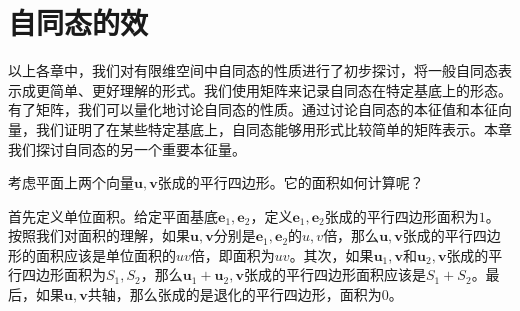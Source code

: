 \documentclass[12pt,UTF8]{ctexbook}
\begin{document}
\chapter{自同态的效}
以上各章中，我们对有限维空间中自同态的性质进行了初步探讨，将一般自同态表示成更简单、更好理解的形式。我们使用矩阵来记录自同态在特定基底上的形态。有了矩阵，我们可以量化地讨论自同态的性质。通过讨论自同态的本征值和本征向量，我们证明了在某些特定基底上，自同态能够用形式比较简单的矩阵表示。本章我们探讨自同态的另一个重要本征量。

考虑平面上两个向量$\mathbf{u}, \mathbf{v}$张成的平行四边形。它的面积如何计算呢？

首先定义单位面积。给定平面基底$\mathbf{e}_1, \mathbf{e}_2$，定义$\mathbf{e}_1, \mathbf{e}_2$张成的平行四边形面积为$1$。按照我们对面积的理解，如果$\mathbf{u}, \mathbf{v}$分别是$\mathbf{e}_1, \mathbf{e}_2$的$u,v$倍，那么$\mathbf{u}, \mathbf{v}$张成的平行四边形的面积应该是单位面积的$uv$倍，即面积为$uv$。其次，如果$\mathbf{u}_1, \mathbf{v}$和$\mathbf{u}_2, \mathbf{v}$张成的平行四边形面积为$S_1, S_2$，那么$\mathbf{u}_1+\mathbf{u}_2, \mathbf{v}$张成的平行四边形面积应该是$S_1+S_2$。最后，如果$\mathbf{u}, \mathbf{v}$共轴，那么张成的是退化的平行四边形，面积为$0$。
\end{document}
